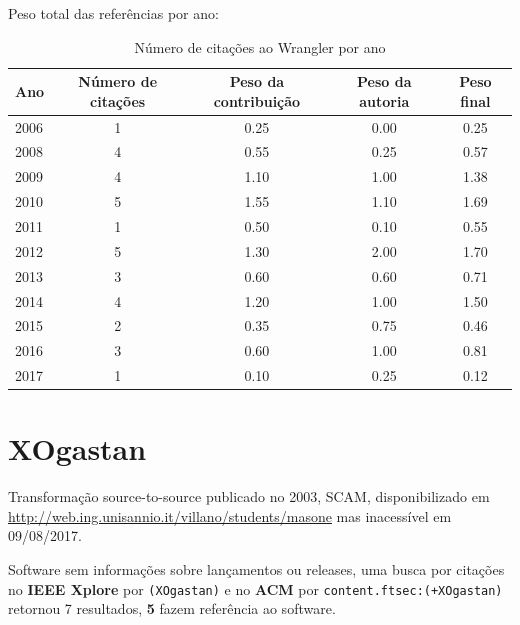 Peso total das referências por ano:

\begin{table}[h]
\caption{Número de citações ao Wrangler por ano}
\centering
\begin{tabular}{| l | c | c | c | c |}
  \hline
  Ano & Número de citações & Peso da contribuição & Peso da autoria & Peso final \\
  \hline
  2006
    & 1
    & 0.25
    & 0.00
    & 0.25 \\
  2008
    & 4
    & 0.55
    & 0.25
    & 0.57 \\
  2009
    & 4
    & 1.10
    & 1.00
    & 1.38 \\
  2010
    & 5
    & 1.55
    & 1.10
    & 1.69 \\
  2011
    & 1
    & 0.50
    & 0.10
    & 0.55 \\
  2012
    & 5
    & 1.30
    & 2.00
    & 1.70 \\
  2013
    & 3
    & 0.60
    & 0.60
    & 0.71 \\
  2014
    & 4
    & 1.20
    & 1.00
    & 1.50 \\
  2015
    & 2
    & 0.35
    & 0.75
    & 0.46 \\
  2016
    & 3
    & 0.60
    & 1.00
    & 0.81 \\
  2017
    & 1
    & 0.10
    & 0.25
    & 0.12 \\
  \hline
\end{tabular}
\end{table}


\section{XOgastan}

Transformação source-to-source
publicado no 2003, SCAM,
disponibilizado em \url{http://web.ing.unisannio.it/villano/students/masone}
mas inacessível em 09/08/2017.

Software sem informações sobre lançamentos ou releases,
uma busca por citações no {\bf IEEE Xplore} por
\texttt{(XOgastan)}
e no {\bf ACM} por
\texttt{content.ftsec:(+XOgastan)}
retornou
7 resultados,
{\bf 5} fazem referência ao software.

